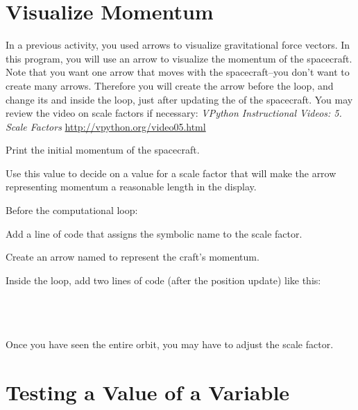 \documentclass[10pt]{article}
\begin{document}
\checkpoint

\section{Visualize Momentum}

In a previous activity, you used arrows to visualize gravitational force vectors. In this program, you will use an arrow to visualize the momentum of the spacecraft.  Note that you want one arrow that moves with the spacecraft--you don't want to create many arrows.  Therefore you will create the arrow before the loop, and change its  and  inside the loop, just after updating the  of the spacecraft.  You may review the video on scale factors if necessary: \textit{VPython Instructional Videos: 5. Scale Factors } \url{http://vpython.org/video05.html}\\

\begin{compactitem}[\color{MIRed}$\Rightarrow$]
\item Print the initial momentum of the spacecraft. 
\item Use this value to decide on a value for a scale factor that will make the arrow representing momentum a reasonable length in the display.
\item Before the computational loop:
\begin{compactitem}[\color{MIRed}$\Rightarrow$]
\item Add a line of code that assigns the symbolic name  to the scale factor.   
\item Create an arrow named  to represent the craft's momentum.
\end{compactitem}
\item Inside the loop, add two lines of code (after the position update) like this:\\\\
\hspace{20pt}\\
\hspace{20pt}\\

\item Once you have seen the entire orbit, you may have to adjust the scale factor.
\end{compactitem}

\section{Testing a Value of a Variable}
\end{document}
